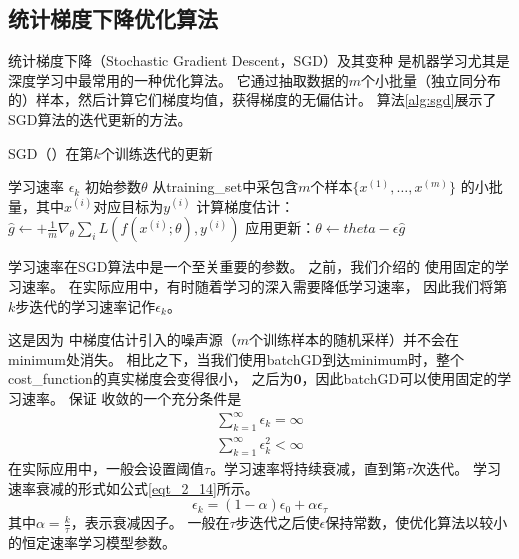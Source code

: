\subsection{统计梯度下降优化算法}
统计梯度下降（Stochastic Gradient Descent，SGD）及其变种
是机器学习尤其是深度学习中最常用的一种优化算法\cite{bottou2010large}。
它通过抽取数据的$m$个小批量（独立同分布的）样本，然后计算它们梯度均值，获得梯度的无偏估计。
算法\ref{alg:sgd}展示了SGD算法的迭代更新的方法。

\begin{algorithm}[ht]
	\caption{\gls{SGD}（）在第$k$个训练迭代的更新}
	\label{alg:sgd}
	\begin{algorithmic}
		\REQUIRE 学习速率 $\epsilon_k$
		\REQUIRE 初始参数$\theta$
		\STATE 从\gls{training_set}中采包含$m$个样本$\{ x^{(1)},\dots, x^{(m)}\}$ 的小批量，其中$x^{(i)}$对应目标为$y^{(i)}$
		\STATE 计算梯度估计： $\hat{g} \leftarrow + 
		\frac{1}{m} \nabla_{\theta} \sum_i L(f(x^{(i)};\theta),y^{(i)})$
		\STATE 应用更新：$\theta \leftarrow theta - \epsilon \hat{g}$
		\ENDWHILE
	\end{algorithmic}
\end{algorithm}

学习速率在SGD算法中是一个至关重要的参数。
之前，我们介绍的\,\,使用固定的学习速率。
在实际应用中，有时随着学习的深入需要降低学习速率，
因此我们将第$k$步迭代的学习速率记作$\epsilon_k$。

这是因为\,\,中梯度估计引入的噪声源（$m$个训练样本的随机采样）并不会在\gls{minimum}处消失。
相比之下，当我们使用\gls{batch}\gls{GD}到达\gls{minimum}时，整个\gls{cost_function}的真实梯度会变得很小，
之后为$\mathbf{0}$，因此\gls{batch}\gls{GD}可以使用固定的学习速率。
保证\,\,收敛的一个充分条件是
\begin{equation}
\label{eq:8.12}
	\begin{aligned}
		\sum_{k=1}^\infty \epsilon_k = \infty\\
		\sum_{k=1}^\infty \epsilon_k^2 < \infty
	\end{aligned}
\end{equation}
在实际应用中，一般会设置阈值$\tau$。学习速率将持续衰减，直到第$\tau$次迭代。
学习速率衰减的形式如公式\eqref{eqt_2_14}所示。
\begin{equation}
\label{eqt_2_14}
\epsilon_k = (1-\alpha) \epsilon_0 + \alpha \epsilon_\tau
\end{equation}
其中$\alpha = \frac{k}{\tau}$，表示衰减因子。
一般在$\tau$步迭代之后使$\epsilon$保持常数，使优化算法以较小的恒定速率学习模型参数。

